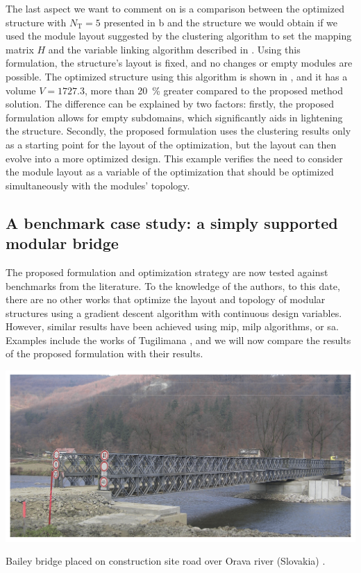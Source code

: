 The last aspect we want to comment on is a comparison between the optimized structure with $N_\text{T}=5$ presented in b and the structure we would obtain if we used the module layout suggested by the clustering algorithm to set the mapping matrix $H$ and the variable linking algorithm described in . Using this formulation, the structure's layout is fixed, and no changes or empty modules are possible. The optimized structure using this algorithm is shown in , and it has a volume $V = 1727.3$, more than \qty{20}{\percent} greater compared to the proposed method solution. The difference can be explained by two factors: firstly, the proposed formulation allows for empty subdomains, which significantly aids in lightening the structure. Secondly, the proposed formulation uses the clustering results only as a starting point for the layout of the optimization, but the layout can then evolve into a more optimized design. This example verifies the need to consider the module layout as a variable of the optimization that should be optimized simultaneously with the modules' topology.

\subsection{A benchmark case study: a simply supported modular bridge}
The proposed formulation and optimization strategy are now tested against benchmarks from the literature. To the knowledge of the authors, to this date, there are no other works that optimize the layout and topology of modular structures using a gradient descent algorithm with continuous design variables. However, similar results have been achieved using \gls{mip}, \gls{milp} algorithms, or \gls{sa}. Examples include the works of Tugilimana \etal {}, and we will now compare the results of the proposed formulation with their results.

\begin{marginfigure}
    \centering
    \includegraphics[width=\linewidth]{figures/06_DMO/00_bailey_bridge/applsci-12-03788-g002.png}
    \caption{Bailey bridge placed on construction site road over Orava river (Slovakia) \cite{prokop_load-carrying_2022}. }
    \label{fig:06_bailey}
\end{marginfigure}

